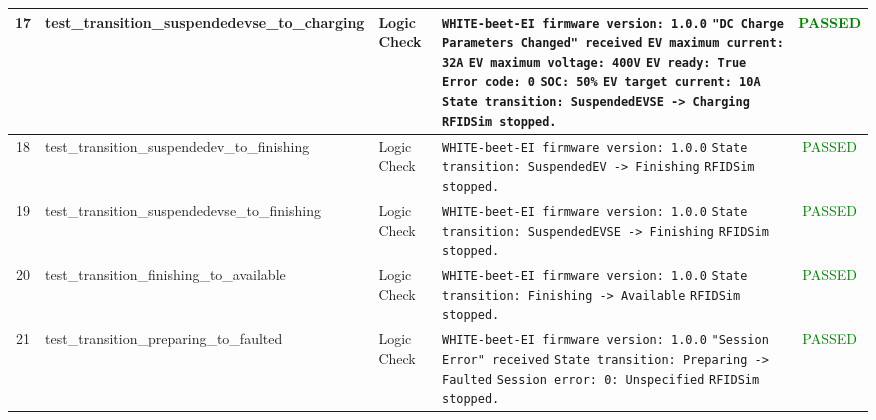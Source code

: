 \documentclass[10pt, a4paper, landscape]{article}
\begin{document}
\begin{longtable}{|c|p{6cm}|p{2.5cm}|p{8cm}|c|}
\hline
17 & test\_transition\_suspendedevse\_to\_charging & Logic Check & \texttt{\scriptsize WHITE-beet-EI firmware version: 1.0.0} \newline \texttt{\scriptsize "DC Charge Parameters Changed" received} \newline \texttt{\scriptsize EV maximum current: 32A} \newline \texttt{\scriptsize EV maximum voltage: 400V} \newline \texttt{\scriptsize EV ready: True} \newline \texttt{\scriptsize Error code: 0} \newline \texttt{\scriptsize SOC: 50\%} \newline \texttt{\scriptsize EV target current: 10A} \newline \texttt{\scriptsize State transition: SuspendedEVSE -> Charging} \newline \texttt{\scriptsize RFIDSim stopped.} & \textcolor{green}{PASSED} \\
\hline
18 & test\_transition\_suspendedev\_to\_finishing & Logic Check & \texttt{\scriptsize WHITE-beet-EI firmware version: 1.0.0} \newline \texttt{\scriptsize State transition: SuspendedEV -> Finishing} \newline \texttt{\scriptsize RFIDSim stopped.} & \textcolor{green}{PASSED} \\
\hline
19 & test\_transition\_suspendedevse\_to\_finishing & Logic Check & \texttt{\scriptsize WHITE-beet-EI firmware version: 1.0.0} \newline \texttt{\scriptsize State transition: SuspendedEVSE -> Finishing} \newline \texttt{\scriptsize RFIDSim stopped.} & \textcolor{green}{PASSED} \\
\hline
20 & test\_transition\_finishing\_to\_available & Logic Check & \texttt{\scriptsize WHITE-beet-EI firmware version: 1.0.0} \newline \texttt{\scriptsize State transition: Finishing -> Available} \newline \texttt{\scriptsize RFIDSim stopped.} & \textcolor{green}{PASSED} \\
\hline
21 & test\_transition\_preparing\_to\_faulted & Logic Check & \texttt{\scriptsize WHITE-beet-EI firmware version: 1.0.0} \newline \texttt{\scriptsize "Session Error" received} \newline \texttt{\scriptsize State transition: Preparing -> Faulted} \newline \texttt{\scriptsize Session error: 0: Unspecified} \newline \texttt{\scriptsize RFIDSim stopped.} & \textcolor{green}{PASSED} \\

\end{longtable}
\end{document}
